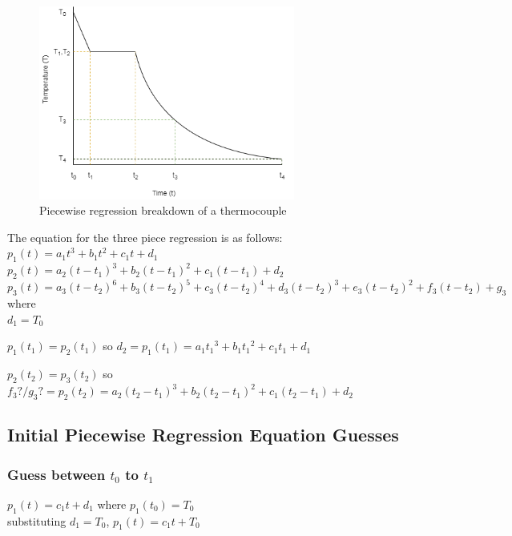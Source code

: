 \documentclass[12pt, titlepage]{article}
\begin{document}
	\begin{figure}[h]
	\centering
	\includegraphics[width=0.75\textwidth]{regression}
	\caption{Piecewise regression breakdown of a thermocouple}
	\end{figure}

	The equation for the three piece regression is as follows: \\

	\noindent $p_1(t) =a_1t^3 + b_1t^2 + c_1t +d_1$ \\
	$p_2(t) =a_2(t-t_1)^3 + b_2(t-t_1)^2 + c_1(t-t_1) +d_2$ \\
	$p_3(t) =a_3(t-t_2)^6 + b_3(t-t_2)^5 + c_3(t-t_2)^4 +d_3(t-t_2)^3 + e_3(t-t_2)^2 +f_3(t-t_2) +g_3 $ \\

	\noindent where\\
	$d_1 = T_0$

	$p_1(t_1) = p_2(t_1)$ 
	so $d_2 = p_1(t_1) = a_1{t_1}^3 + b_1{t_1}^2 + c_1t_1 +d_1$ 

	$p_2(t_2) = p_3(t_2)$
	 so $f_3?/g_3? = p_2(t_2)= a_2(t_2-t_1)^3 + b_2(t_2-t_1)^2 + c_1(t_2-t_1) +d_2 $

\subsection*{Initial Piecewise Regression Equation Guesses} \label{Sec_PiecewiseInitial}

	\subsubsection*{Guess between $t_0$ to $t_1$}
		$p_1(t) = c_1t + d_1$ where $p_1(t_0) = T_0$ \\
		substituting $d_1 = T_0$, $p_1(t) = c_1t + T_0$ \\\\
\end{document}
